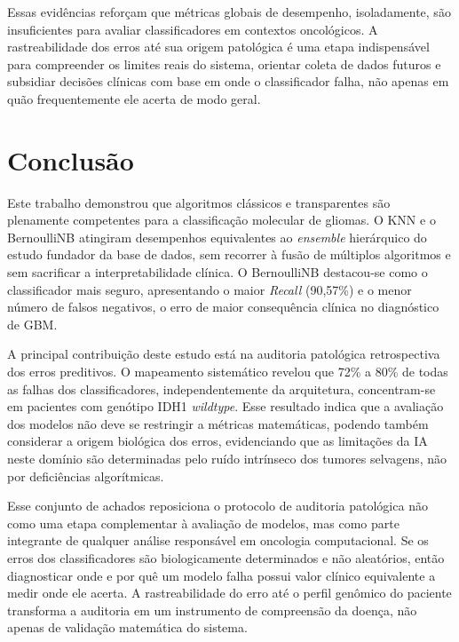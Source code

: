 \documentclass[12pt]{article}
\begin{document}
Essas evidências reforçam que métricas globais de desempenho, isoladamente, são insuficientes para avaliar classificadores em contextos oncológicos. A rastreabilidade dos erros até sua origem patológica é uma etapa indispensável para compreender os limites reais do sistema, orientar coleta de dados futuros e subsidiar decisões clínicas com base em onde o classificador falha, não apenas em quão frequentemente ele acerta de modo geral.

\section{Conclusão}
\label{sec:conclusao}

Este trabalho demonstrou que algoritmos clássicos e transparentes são plenamente competentes para a classificação molecular de gliomas. O KNN e o BernoulliNB atingiram desempenhos equivalentes ao \textit{ensemble} hierárquico do estudo fundador da base de dados, sem recorrer à fusão de múltiplos algoritmos e sem sacrificar a interpretabilidade clínica. O BernoulliNB destacou-se como o classificador mais seguro, apresentando o maior \textit{Recall} (90,57\%) e o menor número de falsos negativos, o erro de maior consequência clínica no diagnóstico de GBM.

A principal contribuição deste estudo está na auditoria patológica retrospectiva dos erros preditivos. O mapeamento sistemático revelou que 72\% a 80\% de todas as falhas dos classificadores, independentemente da arquitetura, concentram-se em pacientes com genótipo IDH1 \textit{wildtype}. Esse resultado indica que a avaliação dos modelos não deve se restringir a métricas matemáticas, podendo também considerar a origem biológica dos erros, evidenciando que as limitações da IA neste domínio são determinadas pelo ruído intrínseco dos tumores selvagens, não por deficiências algorítmicas.

Esse conjunto de achados reposiciona o protocolo de auditoria patológica não como uma etapa complementar à avaliação de modelos, mas como parte integrante de qualquer análise responsável em oncologia computacional. Se os erros dos classificadores são biologicamente determinados e não aleatórios, então diagnosticar onde e por quê um modelo falha possui valor clínico equivalente a medir onde ele acerta. A rastreabilidade do erro até o perfil genômico do paciente transforma a auditoria em um instrumento de compreensão da doença, não apenas de validação matemática do sistema.



\end{document}
